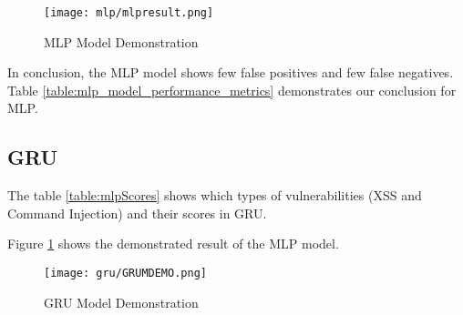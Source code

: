 \begin{figure}[H]
 \centering
 \texttt{[image: mlp/mlpresult.png]}
 \caption{MLP Model Demonstration}
 \label{fig:mlprdemo}
\end{figure}

In conclusion, the MLP model shows few false positives and few false negatives. Table \ref{table:mlp_model_performance_metrics} demonstrates our conclusion for MLP.

\begin{table}[H]
 \centering
 \caption{Model Performance Metrics for Vulnerability Types in MLP}
 \label{table:mlp_model_performance_metrics}
\end{table}

\subsection{GRU}
The table \ref{table:mlpScores} shows which types of vulnerabilities (XSS and Command Injection) and their scores in GRU.
\begin{table}[h]
 \centering
 \caption{Vulnerability Statistics and Model Performance Metrics for XSS and Command Injection in MLP Modal }
 \label{table:vulnerability_statistics}
\end{table}

Figure \ref{fig:mlprdemo} shows the demonstrated result of the MLP model.
\begin{figure}[H]
 \centering
 \texttt{[image: gru/GRUMDEMO.png]}
 \caption{GRU Model Demonstration}
 \label{fig:grudemo}
\end{figure}

